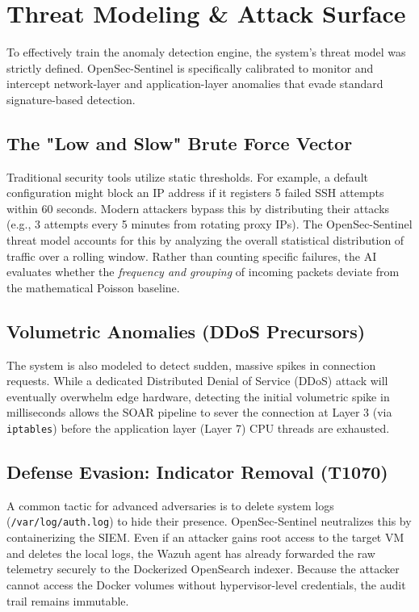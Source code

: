 \documentclass[12pt, a4paper]{report}
\begin{document}
	\section{Threat Modeling \& Attack Surface}
	To effectively train the anomaly detection engine, the system's threat model was strictly defined. OpenSec-Sentinel is specifically calibrated to monitor and intercept network-layer and application-layer anomalies that evade standard signature-based detection.
	
	\subsection{The "Low and Slow" Brute Force Vector}
	Traditional security tools utilize static thresholds. For example, a default configuration might block an IP address if it registers 5 failed SSH attempts within 60 seconds. Modern attackers bypass this by distributing their attacks (e.g., 3 attempts every 5 minutes from rotating proxy IPs). The OpenSec-Sentinel threat model accounts for this by analyzing the overall statistical distribution of traffic over a rolling window. Rather than counting specific failures, the AI evaluates whether the \textit{frequency and grouping} of incoming packets deviate from the mathematical Poisson baseline.
	
	\subsection{Volumetric Anomalies (DDoS Precursors)}
	The system is also modeled to detect sudden, massive spikes in connection requests. While a dedicated Distributed Denial of Service (DDoS) attack will eventually overwhelm edge hardware, detecting the initial volumetric spike in milliseconds allows the SOAR pipeline to sever the connection at Layer 3 (via \texttt{iptables}) before the application layer (Layer 7) CPU threads are exhausted.
	
	\subsection{Defense Evasion: Indicator Removal (T1070)}
	A common tactic for advanced adversaries is to delete system logs (\texttt{/var/log/auth.log}) to hide their presence. OpenSec-Sentinel neutralizes this by containerizing the SIEM. Even if an attacker gains root access to the target VM and deletes the local logs, the Wazuh agent has already forwarded the raw telemetry securely to the Dockerized OpenSearch indexer. Because the attacker cannot access the Docker volumes without hypervisor-level credentials, the audit trail remains immutable.
	
\end{document}
